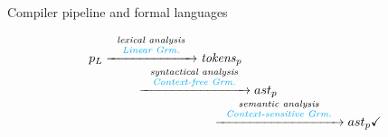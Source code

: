 \documentclass{beamer}
\begin{document}
\begin{frame}{Compiler pipeline and formal languages}

$$
\begin{array}{lllll}
%
%
p_L
\xrightarrow{
  \scriptsize
  \begin{tabular}{c}
    \textit{lexical analysis} \\
    {\color{cyan}\textit{Linear Grm.}}
  \end{tabular}
} \mathit{tokens}_p \\
%
%
\quad \quad \qquad
\xrightarrow{
\scriptsize
\begin{tabular}{c}
\textit{syntactical analysis} \\
{\color{cyan}\textit{Context-free Grm.}}
\end{tabular}
} ast_p \\
%
%
\qquad \qquad \qquad \qquad\qquad
\xrightarrow{
\scriptsize
\begin{tabular}{c}
\textit{semantic analysis} \\
{\color{cyan}\textit{Context-sensitive Grm.}}
\end{tabular}
}
ast_p \checkmark \\
%

\end{array}$$
\end{frame}
\end{document}
